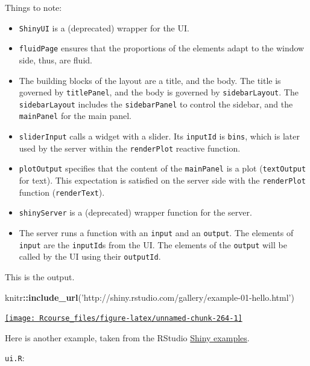 \documentclass[]{book}
\newenvironment{Shaded}{\begin{snugshade}}{\end{snugshade}}
\newcommand{\KeywordTok}[1]{\textcolor[rgb]{0.13,0.29,0.53}{\textbf{#1}}}
\newcommand{\StringTok}[1]{\textcolor[rgb]{0.31,0.60,0.02}{#1}}
\newcommand{\OperatorTok}[1]{\textcolor[rgb]{0.81,0.36,0.00}{\textbf{#1}}}
\newcommand{\NormalTok}[1]{#1}
\providecommand{\tightlist}{%
  \setlength{\itemsep}{0pt}\setlength{\parskip}{0pt}}
\theoremstyle{definition}
\theoremstyle{definition}
\theoremstyle{definition}
\theoremstyle{remark}
\begin{document}
Things to note:

\begin{itemize}
\tightlist
\item
  \texttt{ShinyUI} is a (deprecated) wrapper for the UI.
\item
  \texttt{fluidPage} ensures that the proportions of the elements adapt
  to the window side, thus, are fluid.
\item
  The building blocks of the layout are a title, and the body. The title
  is governed by \texttt{titlePanel}, and the body is governed by
  \texttt{sidebarLayout}. The \texttt{sidebarLayout} includes the
  \texttt{sidebarPanel} to control the sidebar, and the
  \texttt{mainPanel} for the main panel.
\item
  \texttt{sliderInput} calls a widget with a slider. Its
  \texttt{inputId} is \texttt{bins}, which is later used by the server
  within the \texttt{renderPlot} reactive function.
\item
  \texttt{plotOutput} specifies that the content of the
  \texttt{mainPanel} is a plot (\texttt{textOutput} for text). This
  expectation is satisfied on the server side with the
  \texttt{renderPlot} function (\texttt{renderText}).
\item
  \texttt{shinyServer} is a (deprecated) wrapper function for the
  server.
\item
  The server runs a function with an \texttt{input} and an
  \texttt{output}. The elements of \texttt{input} are the
  \texttt{inputId}s from the UI. The elements of the \texttt{output}
  will be called by the UI using their \texttt{outputId}.
\end{itemize}

This is the output.

\begin{Shaded}
\begin{Highlighting}[]
\NormalTok{knitr}\OperatorTok{::}\KeywordTok{include_url}\NormalTok{(}\StringTok{'http://shiny.rstudio.com/gallery/example-01-hello.html'}\NormalTok{)}
\end{Highlighting}
\end{Shaded}

\href{http://shiny.rstudio.com/gallery/example-01-hello.html}{\texttt{[image: Rcourse\_files/figure-latex/unnamed-chunk-264-1]} }

Here is another example, taken from the RStudio
\href{https://github.com/rstudio/shiny-examples/tree/master/006-tabsets}{Shiny
examples}.

\texttt{ui.R}:
\end{document}
